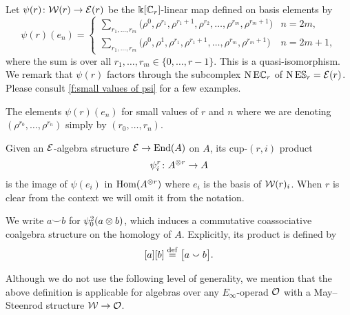 \sssec

Let $\psi(r) \colon \mathcal{W}(r) \to \mathcal{E}(r)$ be the $\Bbbk[\mathbb{C}_r]$-linear map defined on basis elements by
\begin{equation*}
	\psi(r)(e_{n}) = \begin{cases}
		\displaystyle{\sum_{r_1, \dots, r_m}} \big(\rho^0, \rho^{r_1}, \rho^{r_1+1}, \rho^{r_2}, \dots, \rho^{r_{m}}, \rho^{r_{m}+1} \big) & n = 2m, \\
		\displaystyle{\sum_{r_1, \dots, r_m}} \big(\rho^0, \rho^1, \rho^{r_1}, \rho^{r_1+1}, \dots, \rho^{r_{m}}, \rho^{r_{m}+1} \big) & n = 2m+1,
	\end{cases}
\end{equation*}
where the sum is over all $r_1, \dots, r_m \in \{0, \dots, r-1\}$.
This is a quasi-isomorphism.
We remark that $\psi(r)$ factors through the subcomplex $\operatorname{N}\mathrm{E}\mathbb{C}_r$ of $\operatorname{N}\mathrm{E}\mathbb{S}_r = \mathcal{E}(r)$.
Please consult \cref{f:small values of psi} for a few examples.

\begin{table}
	\centering
	
	\caption{The elements $\psi(r)(e_n)$ for small values of $r$ and $n$ where we are denoting $(\rho^{r_0}, \dots, \rho^{r_n})$ simply by $(r_0, \dots, r_n)$.}
	\label{f:small values of psi}
\end{table}

\sssec

Given an $\mathcal{E}$-algebra structure $\mathcal{E} \to \mathrm{End}(A)$ on $A$, its cup-$(r,i)$ product
\[
\psi_i^r \colon A^{\otimes r} \to A
\]
is the image of $\psi(e_i)$ in $\mathrm{Hom}(A^{\otimes r})$ where $e_i$ is the basis of $\mathcal{W}(r)_i$.
When $r$ is clear from the context we will omit it from the notation.

We write $a \smallsmile b$ for $\psi_0^2(a \otimes b)$, which induces a commutative coassociative coalgebra structure on the homology of $A$.
Explicitly, its product is defined by
\[
[a][b] \stackrel{\mathrm{def}}{=} \big[a \smallsmile b\big].
\]

Although we do not use the following level of generality, we mention that the above definition is applicable for algebras over any $E_\infty$-operad $\mathcal{O}$ with a May--Steenrod structure $\mathcal{W} \to \mathcal{O}$.

\sssec

